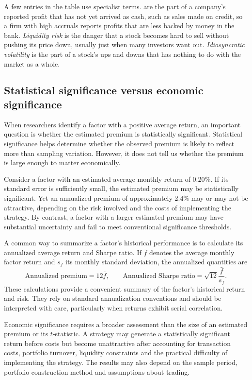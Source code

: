 A few entries in the table use specialist terms.  are the part of a company's reported profit that has not yet arrived as cash, such as sales made on credit, so a firm with high accruals reports profits that are less backed by money in the bank. \emph{Liquidity risk} is the danger that a stock becomes hard to sell without pushing its price down, usually just when many investors want out. \emph{Idiosyncratic volatility} is the part of a stock's ups and downs that has nothing to do with the market as a whole.


\subsection{Statistical significance versus economic significance}
\label{subsec:04-statistical-economic-significance}

When researchers identify a factor with a positive average return, an important question is whether the estimated premium is statistically significant. Statistical significance helps determine whether the observed premium is likely to reflect more than sampling variation. However, it does not tell us whether the premium is large enough to matter economically.

Consider a factor with an estimated average monthly return of 0.20\%. If its standard error is sufficiently small, the estimated premium may be statistically significant. Yet an annualized premium of approximately 2.4\% may or may not be attractive, depending on the risk involved and the costs of implementing the strategy. By contrast, a factor with a larger estimated premium may have substantial uncertainty and fail to meet conventional significance thresholds.

A common way to summarize a factor's historical performance is to calculate its annualized average return and Sharpe ratio. If $\bar{f}$ denotes the average monthly factor return and $s_f$ its monthly standard deviation, the annualized quantities are
\begin{equation}
  \text{Annualized premium}=12\bar{f},
  \qquad
  \text{Annualized Sharpe ratio}
  =\sqrt{12}\frac{\bar{f}}{s_f}.
  \label{eq:04-factor-sharpe}
\end{equation}
These calculations provide a convenient summary of the factor's historical return and risk. They rely on standard annualization conventions and should be interpreted with care, particularly when returns exhibit serial correlation.

Economic significance requires a broader assessment than the size of an estimated premium or its $t$-statistic. A strategy may generate a statistically significant return before costs but become unattractive after accounting for transaction costs, portfolio turnover, liquidity constraints and the practical difficulty of implementing the strategy. The results may also depend on the sample period, portfolio construction method and assumptions about trading.

